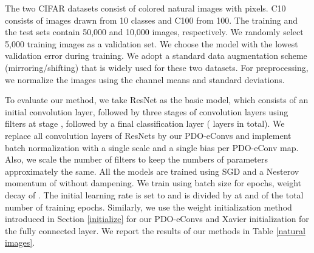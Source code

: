 \documentclass{article}
\begin{document}
The two CIFAR datasets consist of colored natural images with  pixels. C10 consists of images drawn from 10 classes and C100 from 100. The training and the test sets contain 50,000 and 10,000 images, respectively. We randomly select 5,000 training images as a validation set. We choose the model with the lowest validation error during training. We adopt a standard data augmentation scheme (mirroring/shifting) \cite{lee2015deeply} that is widely used for these two datasets. For preprocessing, we normalize the images using the channel means and standard deviations.

To evaluate our method, we take ResNet \cite{he2016identity} as the basic model, which consists of an initial convolution layer, followed by three stages of  convolution layers using  filters at stage , followed by a final classification layer ( layers in total). We replace all convolution layers of ResNets by our PDO-eConvs and implement batch normalization with a single scale and a single bias per PDO-eConv map. Also, we scale the number of filters to keep the numbers of parameters approximately the same. All the models are trained using SGD and a Nesterov momentum \cite{sutskever2013importance} of  without dampening. We train using batch size  for  epochs, weight decay of . The initial learning rate is set to  and is divided by  at  and  of the total number of training epochs. Similarly, we use the weight initialization method introduced in Section \ref{initialize} for our PDO-eConvs and Xavier initialization for the fully connected layer. We report the results of our methods in Table \ref{natural images}.
\end{document}
